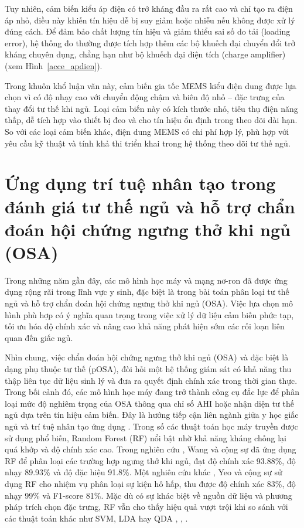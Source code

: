 Tuy nhiên, cảm biến kiểu áp điện có trở kháng đầu ra rất cao và chỉ tạo ra điện áp nhỏ, điều này khiến tín hiệu dễ bị suy giảm hoặc nhiễu nếu không được xử lý đúng cách. Để đảm bảo chất lượng tín hiệu và giảm thiểu sai số do tải (loading error), hệ thống đo thường được tích hợp thêm các bộ khuếch đại chuyển đổi trở kháng chuyên dụng, chẳng hạn như bộ khuếch đại điện tích (charge amplifier) (xem Hình~\ref{acce_apdien}).



Trong khuôn khổ luận văn này, cảm biến gia tốc MEMS kiểu điện dung được lựa chọn vì có độ nhạy cao với chuyển động chậm và biên độ nhỏ – đặc trưng của thay đổi tư thế khi ngủ. Loại cảm biến này có kích thước nhỏ, tiêu thụ điện năng thấp, dễ tích hợp vào thiết bị đeo và cho tín hiệu ổn định trong theo dõi dài hạn. So với các loại cảm biến khác, điện dung MEMS có chi phí hợp lý, phù hợp với yêu cầu kỹ thuật và tính khả thi triển khai trong hệ thống theo dõi tư thế ngủ.

\section{Ứng dụng trí tuệ nhân tạo trong đánh giá tư thế ngủ và hỗ trợ chẩn đoán hội chứng ngưng thở khi ngủ (OSA)}
Trong những năm gần đây, các mô hình học máy và mạng nơ-ron đã được ứng dụng rộng rãi trong lĩnh vực y sinh, đặc biệt là trong bài toán phân loại tư thế ngủ và hỗ trợ chẩn đoán hội chứng ngưng thở khi ngủ (OSA). Việc lựa chọn mô hình phù hợp có ý nghĩa quan trọng trong việc xử lý dữ liệu cảm biến phức tạp, tối ưu hóa độ chính xác và nâng cao khả năng phát hiện sớm các rối loạn liên quan đến giấc ngủ.

Nhìn chung, việc chẩn đoán hội chứng ngưng thở khi ngủ (OSA) và đặc biệt là dạng phụ thuộc tư thế (pOSA), 
đòi hỏi một hệ thống giám sát có khả năng thu thập liên tục dữ liệu sinh lý và 
đưa ra quyết định chính xác trong thời gian thực. 
Trong bối cảnh đó, các mô hình học máy đang trở thành 
công cụ đắc lực để phân loại mức độ nghiêm trọng của OSA 
thông qua chỉ số AHI hoặc nhận diện tư thế ngủ dựa trên tín hiệu cảm biến. 
Đây là hướng tiếp cận liên ngành giữa y học giấc ngủ và trí tuệ nhân tạo ứng dụng \cite{osa_sanchez2025}.
Trong số các thuật toán học máy truyền được sử dụng phổ biến, 
Random Forest (RF) \cite{genuer2020random} nổi bật nhờ khả năng kháng chống lại quá khớp và độ chính xác cao. 
Trong nghiên cứu \cite{wang2023ml_wearable}, Wang và cộng sự đã ứng dụng RF để phân loại các trường hợp ngưng thở khi ngủ, đạt độ chính xác 93.88\%, độ nhạy 89.93\% và độ đặc hiệu 91.8\%. 
Một nghiên cứu khác \cite{yeo2022respiratory}, Yeo và cộng sự sử dụng RF cho nhiệm vụ phân loại sự kiện hô hấp, thu được độ chính xác 83\%, độ nhạy 99\% và F1-score 81\%. 
Mặc dù có sự khác biệt về nguồn dữ liệu và phương pháp trích chọn đặc trưng, RF vẫn cho thấy hiệu quả vượt trội khi 
so sánh với các thuật toán khác như SVM, LDA hay QDA \cite{wang2023ml_wearable}, \cite{yeo2022respiratory}, \cite{parbat2024multiscale}.

